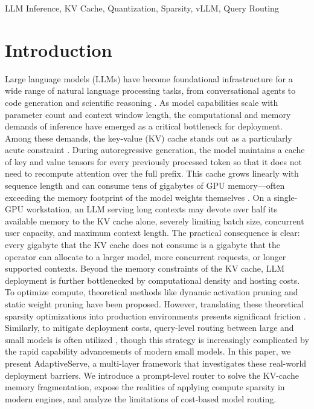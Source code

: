 \documentclass[10pt, conference]{IEEEtran}
\begin{document}
\begin{IEEEkeywords}
LLM Inference, KV Cache, Quantization, Sparsity, vLLM, Query Routing
\end{IEEEkeywords}
\section{Introduction}
Large language models (LLMs) have become foundational infrastructure for a wide range of natural language processing tasks, from conversational agents to code generation and scientific reasoning \cite{brown2020language, touvron2023llama}. As model capabilities scale with parameter count and context window length, the computational and memory demands of inference have emerged as a critical bottleneck for deployment. Among these demands, the key-value (KV) cache stands out as a particularly acute constraint \cite{pope2023efficiently}. During autoregressive generation, the model maintains a cache of key and value tensors for every previously processed token so that it does not need to recompute attention over the full prefix. This cache grows linearly with sequence length and can consume tens of gigabytes of GPU memory—often exceeding the memory footprint of the model weights themselves \cite{kwon2023efficient}. On a single-GPU workstation, an LLM serving long contexts may devote over half its available memory to the KV cache alone, severely limiting batch size, concurrent user capacity, and maximum context length. The practical consequence is clear: every gigabyte that the KV cache does not consume is a gigabyte that the operator can allocate to a larger model, more concurrent requests, or longer supported contexts.
Beyond the memory constraints of the KV cache, LLM deployment is further bottlenecked by computational density and hosting costs. To optimize compute, theoretical methods like dynamic activation pruning \cite{wang2023rsparse} and static weight pruning \cite{sun2023wanda} have been proposed. However, translating these theoretical sparsity optimizations into production environments presents significant friction \cite{hoefler2021sparsity, gale2019state}. Similarly, to mitigate deployment costs, query-level routing between large and small models is often utilized \cite{chen2023frugalgpt}, though this strategy is increasingly complicated by the rapid capability advancements of modern small models. In this paper, we present AdaptiveServe, a multi-layer framework that investigates these real-world deployment barriers. We introduce a prompt-level router to solve the KV-cache memory fragmentation, expose the realities of applying compute sparsity in modern engines, and analyze the limitations of cost-based model routing.
\end{document}
